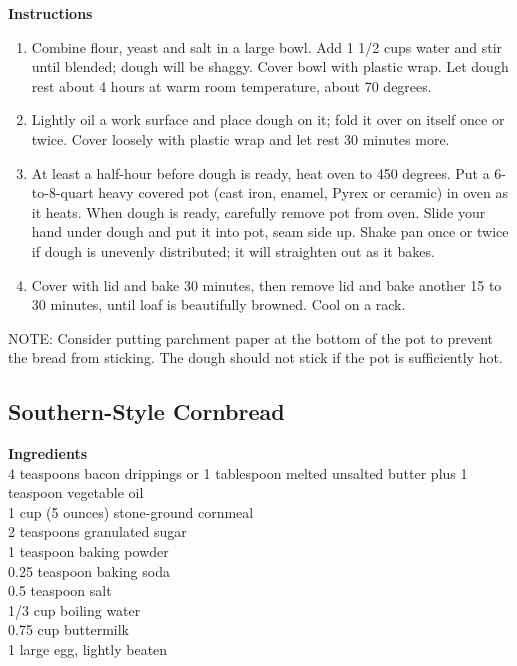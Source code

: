 \documentclass{article}
\numberwithin{figure}{section}
\numberwithin{equation}{section}
\begin{document}
{\bf Instructions}
\begin{enumerate}

\item Combine flour, yeast and salt in a large bowl. Add 1 1/2 cups water and stir until blended; dough will be shaggy. Cover bowl with plastic wrap. Let dough rest about 4 hours at warm room temperature, about 70 degrees.

\item Lightly oil a work surface and place dough on it; fold it over on itself once or twice. Cover loosely with plastic wrap and let rest 30 minutes more.

\item At least a half-hour before dough is ready, heat oven to 450 degrees. Put a 6-to-8-quart heavy covered pot (cast iron, enamel, Pyrex or ceramic) in oven as it heats. When dough is ready, carefully remove pot from oven. Slide your hand under dough and put it into pot, seam side up. Shake pan once or twice if dough is unevenly distributed; it will straighten out as it bakes.

\item Cover with lid and bake 30 minutes, then remove lid and bake another 15 to 30 minutes, until loaf is beautifully browned. Cool on a rack.
\end{enumerate}

NOTE: Consider putting parchment paper at the bottom of the pot to prevent the bread from sticking. The dough should not stick if the pot is sufficiently hot.


\pagebreak
\subsection{Southern-Style Cornbread}
{\bf Ingredients}\\
4 teaspoons bacon drippings or 1 tablespoon melted unsalted butter plus 1 teaspoon vegetable oil\\
1 cup (5 ounces) stone-ground cornmeal\\
2 teaspoons granulated sugar\\
1 teaspoon baking powder\\
0.25 teaspoon baking soda\\
0.5 teaspoon salt\\
1/3 cup boiling water\\
0.75 cup buttermilk\\
1 large egg, lightly beaten\\
\end{document}
